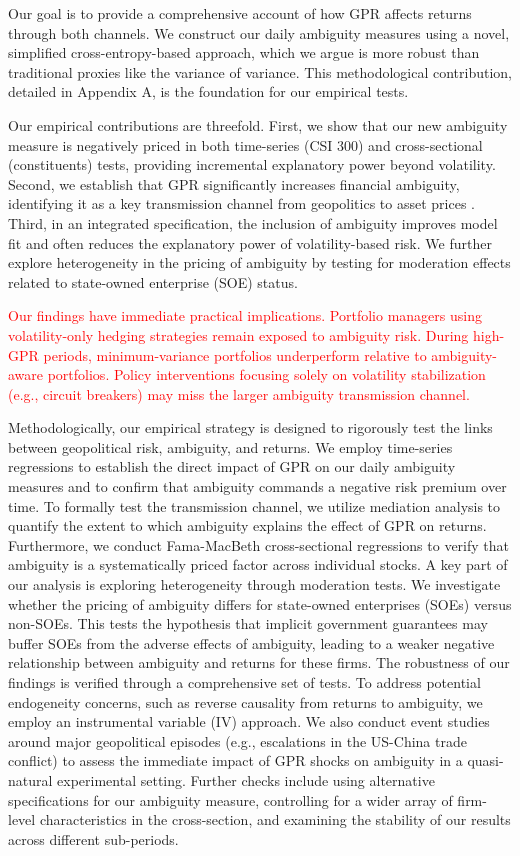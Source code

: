 \documentclass[preprint,12pt,authoryear]{elsarticle}
\begin{document}
Our goal is to provide a comprehensive account of how GPR affects returns through both channels. We construct our daily ambiguity measures using a novel, simplified cross-entropy-based approach, which we argue is more robust than traditional proxies like the variance of variance. This methodological contribution, detailed in Appendix A, is the foundation for our empirical tests.

Our empirical contributions are threefold. First, we show that our new ambiguity measure is negatively priced in both time-series (CSI 300) and cross-sectional (constituents) tests, providing incremental explanatory power beyond volatility. Second, we establish that GPR significantly increases financial ambiguity, identifying it as a key transmission channel from geopolitics to asset prices \citep{Caldara2022}. Third, in an integrated specification, the inclusion of ambiguity improves model fit and often reduces the explanatory power of volatility-based risk. We further explore heterogeneity in the pricing of ambiguity by testing for moderation effects related to state-owned enterprise (SOE) status.

\textcolor{red}{Our findings have immediate practical implications. Portfolio managers using volatility-only hedging strategies remain exposed to ambiguity risk. During high-GPR periods, minimum-variance portfolios underperform relative to ambiguity-aware portfolios. Policy interventions focusing solely on volatility stabilization (e.g., circuit breakers) may miss the larger ambiguity transmission channel.}

Methodologically, our empirical strategy is designed to rigorously test the links between geopolitical risk, ambiguity, and returns. We employ time-series regressions to establish the direct impact of GPR on our daily ambiguity measures and to confirm that ambiguity commands a negative risk premium over time. To formally test the transmission channel, we utilize mediation analysis to quantify the extent to which ambiguity explains the effect of GPR on returns. Furthermore, we conduct Fama-MacBeth cross-sectional regressions to verify that ambiguity is a systematically priced factor across individual stocks. A key part of our analysis is exploring heterogeneity through moderation tests. We investigate whether the pricing of ambiguity differs for state-owned enterprises (SOEs) versus non-SOEs. This tests the hypothesis that implicit government guarantees may buffer SOEs from the adverse effects of ambiguity, leading to a weaker negative relationship between ambiguity and returns for these firms. The robustness of our findings is verified through a comprehensive set of tests. To address potential endogeneity concerns, such as reverse causality from returns to ambiguity, we employ an instrumental variable (IV) approach. We also conduct event studies around major geopolitical episodes (e.g., escalations in the US-China trade conflict) to assess the immediate impact of GPR shocks on ambiguity in a quasi-natural experimental setting. Further checks include using alternative specifications for our ambiguity measure, controlling for a wider array of firm-level characteristics in the cross-section, and examining the stability of our results across different sub-periods.
\end{document}
